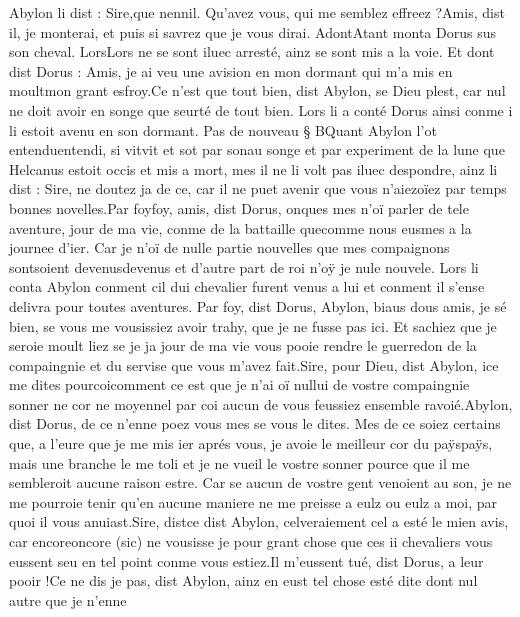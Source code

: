\documentclass{article}
\begin{document}
\begin{pages}
   Abylon li dist :
   Sire,que nennil. 
      Qu’avez vous, qui me semblez effreez ?Amis, dist il, je monterai, et puis si savrez que je vous dirai.
   AdontAtant monta Dorus sus son cheval. 
   LorsLors ne se sont iluec arresté, 
   ainz se sont mis a la voie. 
   Et dont dist Dorus :
   Amis, je ai veu une avision en mon dormant 
      qui m’a mis en moultmon grant esfroy.Ce n’est que tout bien, dist Abylon, se Dieu plest, 
      car nul ne doit avoir en songe que seurté de tout bien.
   Lors li a conté Dorus ainsi conme i li estoit avenu en 
      son dormant. \pend
\pstart Pas de nouveau § BQuant Abylon 
   l’ot entenduentendi, si 
   vitvit et sot par sonau 
   songe et par experiment de la lune que Helcanus estoit occis et mis a mort, 
   mes il ne li volt pas iluec despondre, ainz li dist :
   Sire, ne doutez ja de ce, car il ne puet avenir que vous 
      n’aiezoïez par temps bonnes novelles.Par foyfoy, amis, dist 
      Dorus, onques mes n’oï parler de tele aventure, jour de ma vie, 
      conme de la 
      battaille quecomme nous eusmes a la journee d’ier. Car je n’oï de nulle 
      partie nouvelles que mes compaignons sontsoient 
      devenusdevenus et d'autre part de roi 
         n'oÿ je nule nouvele.
   Lors li conta Abylon conment cil dui chevalier furent venus a lui 
      et conment il s’ense delivra pour toutes aventures.
   Par foy, dist Dorus, Abylon, 
   biaus dous amis, je sé bien, se vous me vousissiez avoir trahy, que je ne fusse pas ici. Et sachiez que je seroie moult liez 
   se je ja jour de ma vie vous pooie rendre le guerredon de la compaingnie et du servise que vous m’avez fait.Sire, pour Dieu, dist Abylon, ice me dites 
      pourcoicomment ce est que 
   je n’ai oï nullui de vostre compaingnie sonner ne cor ne moyennel par coi aucun de vous feussiez ensemble ravoié.Abylon, dist Dorus, 
      de ce n’enne poez vous mes se vous le dites. Mes de ce soiez certains 
      que, a l’eure que je me mis ier aprés vous, je avoie le meilleur cor 
      du paÿspaÿs, mais une branche le me toli et je ne vueil le vostre sonner 
      pource que il me sembleroit aucune raison estre. Car se aucun de vostre gent venoient au son, je ne me pourroie tenir qu’en aucune 
      maniere ne me preisse a eulz ou eulz a moi, par quoi il vous anuiast.Sire, distce dist 
      Abylon, celveraiement cel a esté le 
      mien avis, car encoreoncore (sic) ne vousisse 
      je pour grant chose que ces ii 
      chevaliers vous eussent seu en tel point conme vous estiez.Il m’eussent tué, dist Dorus, a leur pooir !Ce ne dis je pas, dist Abylon, 
      ainz en eust tel chose esté dite dont nul autre que je n’enne 

\end{pages}
\end{document}
